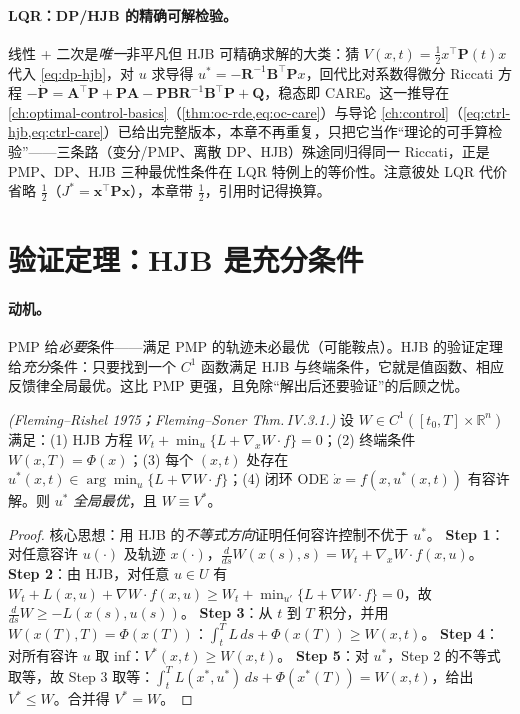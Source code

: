 \paragraph{LQR：DP/HJB 的精确可解检验。}线性 + 二次是\emph{唯一}非平凡但 HJB 可精确求解的大类：猜 $V(x,t)=\tfrac12 x^\top\mathbf P(t)x$ 代入 \cref{eq:dp-hjb}，对 $u$ 求导得 $u^*=-\mathbf R^{-1}\mathbf B^\top\mathbf P x$，回代比对系数得微分 Riccati 方程 $-\dot{\mathbf P}=\mathbf A^\top\mathbf P+\mathbf P\mathbf A-\mathbf P\mathbf B\mathbf R^{-1}\mathbf B^\top\mathbf P+\mathbf Q$，稳态即 CARE。这一推导在 \cref{ch:optimal-control-basics}（\cref{thm:oc-rde,eq:oc-care}）与导论 \cref{ch:control}（\cref{eq:ctrl-hjb,eq:ctrl-care}）已给出完整版本，本章不再重复，只把它当作“理论的可手算检验”——三条路（变分/PMP、离散 DP、HJB）殊途同归得同一 Riccati，正是 PMP、DP、HJB 三种最优性条件在 LQR 特例上的等价性。注意彼处 LQR 代价省略 $\tfrac12$（$J^*=\mathbf x^\top\mathbf P\mathbf x$），本章带 $\tfrac12$，引用时记得换算。

\section{验证定理：HJB 是充分条件}
\label{sec:dp-verification}

\paragraph{动机。}
PMP 给\emph{必要}条件——满足 PMP 的轨迹未必最优（可能鞍点）。HJB 的验证定理给\emph{充分}条件：只要找到一个 $C^1$ 函数满足 HJB 与终端条件，它就是值函数、相应反馈律全局最优。这比 PMP 更强，且免除“解出后还要验证”的后顾之忧。

\begin{theorem}[验证定理]\label{thm:dp-verification}
\emph{(Fleming--Rishel 1975；Fleming--Soner Thm.\,IV.3.1\cite{flemingsoner2006}.)} 设 $W\in C^1([t_0,T]\times\mathbb R^n)$ 满足：(1) HJB 方程 $W_t+\min_u\{L+\nabla_xW\cdot f\}=0$；(2) 终端条件 $W(x,T)=\Phi(x)$；(3) 每个 $(x,t)$ 处存在 $u^*(x,t)\in\arg\min_u\{L+\nabla W\cdot f\}$；(4) 闭环 ODE $\dot x=f(x,u^*(x,t))$ 有容许解。则 $u^*$ \emph{全局最优}，且 $W\equiv V^*$。
\end{theorem}

\begin{proof}
核心思想：用 HJB 的\emph{不等式方向}证明任何容许控制不优于 $u^*$。
\textbf{Step 1}：对任意容许 $u(\cdot)$ 及轨迹 $x(\cdot)$，$\tfrac{d}{ds}W(x(s),s)=W_t+\nabla_xW\cdot f(x,u)$。
\textbf{Step 2}：由 HJB，对任意 $u\in U$ 有 $W_t+L(x,u)+\nabla W\cdot f(x,u)\ge W_t+\min_{u'}\{L+\nabla W\cdot f\}=0$，故 $\tfrac{d}{ds}W\ge-L(x(s),u(s))$。
\textbf{Step 3}：从 $t$ 到 $T$ 积分，并用 $W(x(T),T)=\Phi(x(T))$：$\int_t^T L\,ds+\Phi(x(T))\ge W(x,t)$。
\textbf{Step 4}：对所有容许 $u$ 取 inf：$V^*(x,t)\ge W(x,t)$。
\textbf{Step 5}：对 $u^*$，Step 2 的不等式取等，故 Step 3 取等：$\int_t^T L(x^*,u^*)\,ds+\Phi(x^*(T))=W(x,t)$，给出 $V^*\le W$。合并得 $V^*=W$。
\end{proof}


